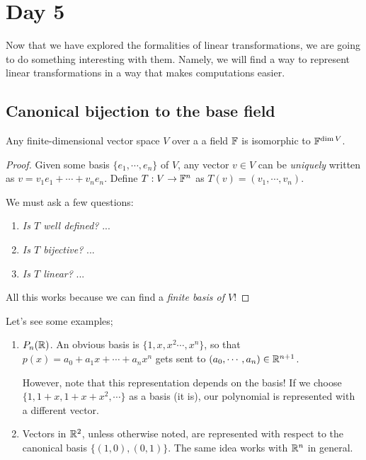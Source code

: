 
\pagebreak
\section{Day 5}


Now that we have explored the formalities of linear transformations, we are going to do something interesting with them. Namely, we will find a way to represent linear transformations in a way that makes computations easier.

\subsection{Canonical bijection to the base field}
\begin{theorem}[Important]
  Any finite-dimensional vector space $V$ over a a field $\mathbb{F}$ is isomorphic to $\mathbb{F}^{\dim V}$.
\end{theorem}
\begin{proof}
  Given some basis $\{e_1,\cdots,e_n\}$ of $V$, any vector $v\in V$ can be \emph{uniquely} written as $v=v_1e_1 + \cdots + v_ne_n$. Define $T:V\to\mathbb{F}^n$ as $T(v)=(v_1,\cdots,v_n)$.

  We must ask a few questions:
  \begin{enumerate}[1)]
    \item \emph{Is $T$ well defined?} ...

    \item \emph{Is $T$ bijective?} ...

    \item \emph{Is $T$ linear?} ...
  \end{enumerate}

  All this works because we can find a \emph{finite basis of $V$}!
\end{proof}


Let's see some examples;
\begin{enumerate}[{Ex }1)]
  \item $P_n(\mathbb{R})$. An obvious basis is $\{1,x,x^2\cdots,x^n\}$, so that $p(x)=a_0+a_1x+\cdots+a_nx^n$ gets sent to $(a_0,\cdots,a_n)\in\mathbb{R}^{n+1}$.

  However, note that this representation depends on the basis! If we choose $\{1,1+x,1+x+x^2,\cdots\}$ as a basis (it is), our polynomial is represented with a different vector.

  \item Vectors in $\mathbb{R}^2$, unless otherwise noted, are represented with respect to the canonical basis $\{(1,0),(0,1)\}$. The same idea works with $\mathbb{R}^n$ in general.
\end{enumerate}


